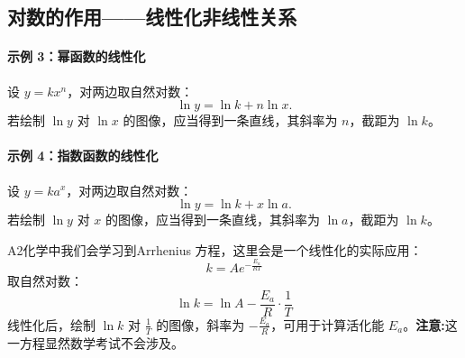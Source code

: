 \documentclass[8pt,a4paper,twoside]{tau-class/tau}
\begin{document}
\subsection{对数的作用——线性化非线性关系}

\paragraph{示例 3：幂函数的线性化}
设 $y = kx^n$，对两边取自然对数：
\[
    \ln y = \ln k + n \ln x.
\]
若绘制 $\ln y$ 对 $\ln x$ 的图像，应当得到一条直线，其斜率为 $n$，截距为 $\ln k$。

\paragraph{示例 4：指数函数的线性化}
设 $y = k a^x$，对两边取自然对数：
\[
    \ln y = \ln k + x \ln a.
\]
若绘制 $\ln y$ 对 $x$ 的图像，应当得到一条直线，其斜率为 $\ln a$，截距为 $\ln k$。
\begin{tcolorbox}[enhanced, breakable, boxsep=1pt, colframe=white!50!black, colback=white, fonttitle=\footnotesize, fontupper=\footnotesize, title=Arrhenius 方程与对数线性化的应用]
A2化学中我们会学习到Arrhenius 方程，这里会是一个线性化的实际应用：
\[
k  = A e^{−\frac{E_a}{RT}}
\]
取自然对数：
\[
\ln k = \ln A − \frac{E_a}{R} \cdot \frac{1}{T}
\]
线性化后，绘制 \(\ln k\) 对 \(\frac{1}{T}\) 的图像，斜率为 \(−\frac{E_a}{R}\)，可用于计算活化能 \( E_a \)。\textbf{注意:}这一方程显然数学考试不会涉及。
\end{tcolorbox}
\newpage
\end{document}
